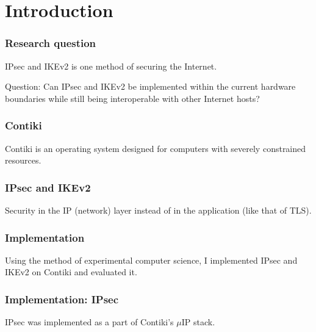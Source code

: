 \documentclass[pdf]{beamer}
\begin{document}
\section{Introduction}
\begin{frame}
   \frametitle{Research question}
   
   IPsec and IKEv2 is one method of securing the Internet.
   \pause
   
   Question: Can IPsec and IKEv2 be implemented within the current hardware boundaries while still being interoperable with other Internet hosts?
 
\end{frame}

\begin{frame}
   \frametitle{Contiki}
   Contiki is an operating system designed for computers with severely constrained resources.
\end{frame}

\begin{frame}
   \frametitle{IPsec and IKEv2}
   Security in the IP (network) layer instead of in the application (like that of TLS).
\end{frame}


\begin{frame}
   \frametitle{Implementation}
   Using the method of experimental computer science, I implemented IPsec and IKEv2 on Contiki and evaluated it.

      
\end{frame}


\begin{frame}
   \frametitle{Implementation: IPsec}
   IPsec was implemented as a part of Contiki's $\mu$IP stack.
\end{frame}
\end{document}
